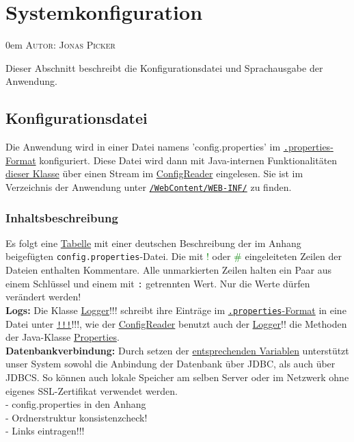 \documentclass{article}
\makeatletter
\newcommand{\sectionauthor}[1]{
	{\parindent 0em \large \scshape Autor: #1 \par \nobreak \vspace*{1em}}
	\@afterheading
}
\makeatother
\begin{document}
\section{Systemkonfiguration}
\sectionauthor{Jonas Picker}
Dieser Abschnitt beschreibt die Konfigurationsdatei und Sprachausgabe der Anwendung.
\subsection{Konfigurationsdatei}
\indent Die Anwendung wird in einer Datei namens 'config.properties' im \hyperlink{https://de.wikipedia.org/wiki/Java-Properties-Datei}{{\texttt.properties}-Format} konfiguriert. Diese Datei wird dann mit Java-internen Funktionalitäten \hyperlink{https://docs.oracle.com/javase/7/docs/api/java/util/Properties.html}{dieser Klasse} über einen Stream im \hyperlink{ConfigReader}{ConfigReader} eingelesen. Sie ist im Verzeichnis der Anwendung unter \hyperlink{Paketstruktur}{\texttt{/WebContent/WEB-INF/}} zu finden.
\subsubsection{Inhaltsbeschreibung}
\hypertarget{propSchema}{}
Es folgt eine \hyperlink{tabelle}{Tabelle} mit einer deutschen Beschreibung der im Anhang beigefügten \texttt{config.properties}-Datei. Die mit \textcolor{green}{!} oder \textcolor{green}{\#} eingeleiteten Zeilen der Dateien enthalten Kommentare. Alle unmarkierten Zeilen halten ein Paar aus einem Schlüssel und einem mit \texttt{:} getrennten Wert. Nur die Werte dürfen verändert werden! \\
\textbf{Logs:} Die Klasse \hyperlink{Logger}{Logger}!!! schreibt ihre Einträge im \hyperlink{https://de.wikipedia.org/wiki/Java-Properties-Datei}{\texttt{.properties}-Format} in eine Datei unter \hyperlink{Paketstruktur}{\texttt{!!!}}!!!, wie der \hyperlink{ConfigReader}{ConfigReader} benutzt auch der \hyperlink{Logger}{Logger}!! die Methoden der Java-Klasse \hyperlink{https://docs.oracle.com/javase/7/docs/api/java/util/Properties.html}{Properties}.\\
\textbf{Datenbankverbindung:} Durch setzen der \hyperlink{DBSSL}{entsprechenden Variablen} unterstützt unser System sowohl die Anbindung der Datenbank über JDBC, als auch über JDBCS. So können auch lokale Speicher am selben Server oder im Netzwerk ohne eigenes SSL-Zertifikat verwendet werden. \\
- config.properties in den Anhang\\
- Ordnerstruktur konsistenzcheck!\\
- Links eintragen!!!\\
\end{document}
